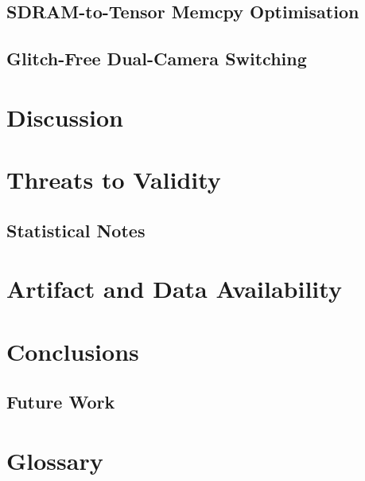 \documentclass[drones,article,submit,pdftex,moreauthors]{Definitions/mdpi}
\begin{document}
\subsection{SDRAM-to-Tensor Memcpy Optimisation}


\subsection{Glitch-Free Dual-Camera Switching}


\section{Discussion}


\section{Threats to Validity}


\subsection{Statistical Notes}


\section{Artifact and Data Availability}


\section{Conclusions}


\subsection{Future Work}




\clearpage
\appendix
\setcounter{section}{0}
\setcounter{subsection}{0}


\section{Glossary}

\end{document}
